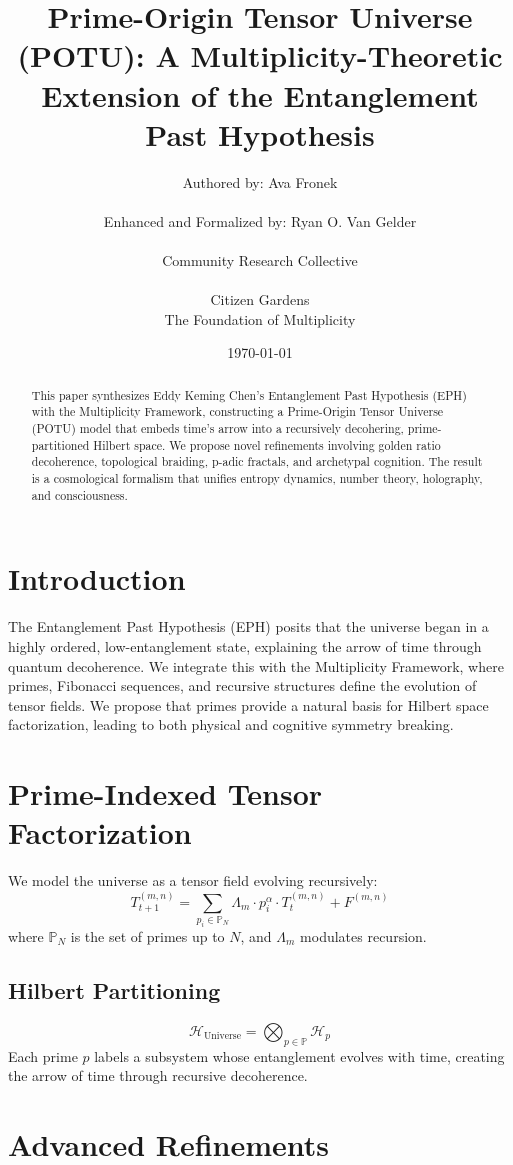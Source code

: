 \documentclass[12pt]{article}
\title{Prime-Origin Tensor Universe (POTU): A Multiplicity-Theoretic Extension of the Entanglement Past Hypothesis}
\author{Authored by: Ava Fronek \\ \\ Enhanced and Formalized by: Ryan O. Van Gelder \\ \\ Community Research Collective \\ \\ Citizen Gardens \\ The Foundation of Multiplicity}
\date{\today}
\begin{document}
\maketitle

\begin{abstract}
This paper synthesizes Eddy Keming Chen's Entanglement Past Hypothesis (EPH) with the Multiplicity Framework, constructing a Prime-Origin Tensor Universe (POTU) model that embeds time’s arrow into a recursively decohering, prime-partitioned Hilbert space. We propose novel refinements involving golden ratio decoherence, topological braiding, p-adic fractals, and archetypal cognition. The result is a cosmological formalism that unifies entropy dynamics, number theory, holography, and consciousness.
\end{abstract}
\newpage
\section{Introduction}
The Entanglement Past Hypothesis (EPH) posits that the universe began in a highly ordered, low-entanglement state, explaining the arrow of time through quantum decoherence. We integrate this with the Multiplicity Framework, where primes, Fibonacci sequences, and recursive structures define the evolution of tensor fields. We propose that primes provide a natural basis for Hilbert space factorization, leading to both physical and cognitive symmetry breaking.

\section{Prime-Indexed Tensor Factorization}
We model the universe as a tensor field evolving recursively:
\[
T_{t+1}^{(m,n)} = \sum_{p_i \in \mathbb{P}_N} \Lambda_m \cdot p_i^\alpha \cdot T_t^{(m,n)} + F^{(m,n)}
\]
where $\mathbb{P}_N$ is the set of primes up to $N$, and $\Lambda_m$ modulates recursion.

\subsection{Hilbert Partitioning}
\[
\mathcal{H}_\text{Universe} = \bigotimes_{p \in \mathbb{P}} \mathcal{H}_p
\]
Each prime $p$ labels a subsystem whose entanglement evolves with time, creating the arrow of time through recursive decoherence.

\section{Advanced Refinements}
\end{document}
